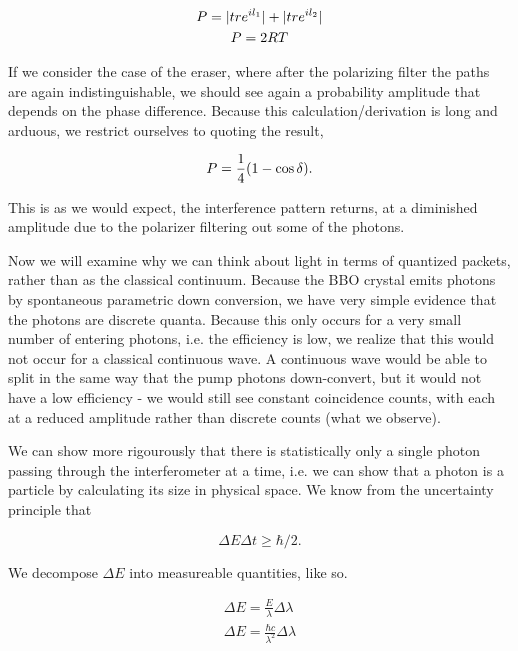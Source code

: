 \documentclass{article}
\DeclarePairedDelimiter\abs{\lvert}{\rvert}%
\DeclarePairedDelimiter{\parens}{\lparen}{\rparen}
\begin{document}
	\begin{gather}
		P = \abs{tre^{il_1}} + \abs{tre^{il_2}} \\
		P = 2RT
	\end{gather}

	If we consider the case of the eraser, where after the polarizing filter the paths are again indistinguishable, we should see again a probability amplitude that depends on the phase difference.  Because this calculation/derivation is long and arduous, we restrict ourselves to quoting the result, 

	\begin{equation}
		P = \frac{1}{4}\parens*{1-\cos{\delta}}.
	\end{equation}

	This is as we would expect, the interference pattern returns, at a diminished amplitude due to the polarizer filtering out some of the photons.

	\hspace{.5cm}

	Now we will examine why we can think about light in terms of quantized packets, rather than as the classical continuum.  Because the BBO crystal emits photons by spontaneous parametric down conversion, we have very simple evidence that the photons are discrete quanta.  Because this only occurs for a very small number of entering photons, i.e. the efficiency is low, we realize that this would not occur for a classical continuous wave.  A continuous wave would be able to split in the same way that the pump photons down-convert, but it would not have a low efficiency - we would still see constant coincidence counts, with each at a reduced amplitude rather than discrete counts (what we observe).

	\hspace{.5cm}

	We can show more rigourously that there is statistically only a single photon passing through the interferometer at a time, i.e. we can show that a photon is a particle by calculating its size in physical space.  We know from the uncertainty principle that

	\begin{equation*}
		\Delta E \Delta t \geq \hbar/2.
	\end{equation*}

	We decompose $\Delta E$ into measureable quantities, like so.

	\begin{gather*}
		\Delta E = \frac{E}{\lambda} \Delta \lambda \\
		\Delta E = \frac{\hbar c}{\lambda^2}\Delta \lambda
	\end{gather*}
\end{document}
